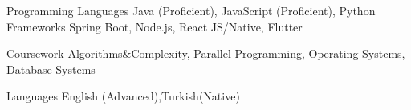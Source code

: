 

\begin{cvskills}

  \cvskill
    {Programming Languages} %
    {Java (Proficient), JavaScript (Proficient), Python} %
  \cvskill
    {Frameworks} %
    {Spring Boot, Node.js, React JS/Native, Flutter } %

  \cvskill
  {Coursework}
  {Algorithms\&Complexity, Parallel Programming, Operating Systems, Database Systems }

  \cvskill
    {Languages} %
    {English (Advanced),Turkish(Native)} %

\end{cvskills}
